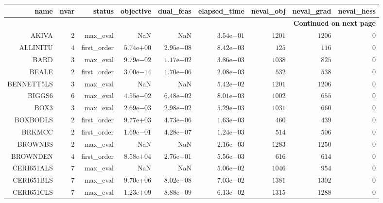 \begin{longtable}{rrrrrrrrr}
\hline
name & nvar & status & objective & dual\_feas & elapsed\_time & neval\_obj & neval\_grad & neval\_hess \\\hline
\endhead
\hline
\multicolumn{9}{r}{{\bfseries Continued on next page}}\\
\hline
\endfoot
\endlastfoot
AKIVA & \(     2\) & max\_eval &       NaN &       NaN & \( 3.54\)e\(-01\) & \(  1201\) & \(  1206\) & \(     0\) \\
ALLINITU & \(     4\) & first\_order & \( 5.74\)e\(+00\) & \( 2.95\)e\(-08\) & \( 8.42\)e\(-03\) & \(   125\) & \(   116\) & \(     0\) \\
BARD & \(     3\) & max\_eval & \( 9.79\)e\(-02\) & \( 1.17\)e\(-02\) & \( 3.86\)e\(-03\) & \(  1038\) & \(   825\) & \(     0\) \\
BEALE & \(     2\) & first\_order & \( 3.00\)e\(-14\) & \( 1.70\)e\(-06\) & \( 2.08\)e\(-03\) & \(   532\) & \(   538\) & \(     0\) \\
BENNETT5LS & \(     3\) & max\_eval &       NaN &       NaN & \( 5.42\)e\(-02\) & \(  1201\) & \(  1206\) & \(     0\) \\
BIGGS6 & \(     6\) & max\_eval & \( 4.55\)e\(-02\) & \( 6.48\)e\(-02\) & \( 8.01\)e\(-03\) & \(  1002\) & \(   655\) & \(     0\) \\
BOX3 & \(     3\) & max\_eval & \( 2.69\)e\(-03\) & \( 2.98\)e\(-02\) & \( 5.29\)e\(-03\) & \(  1031\) & \(   660\) & \(     0\) \\
BOXBODLS & \(     2\) & first\_order & \( 9.77\)e\(+03\) & \( 4.73\)e\(-06\) & \( 1.63\)e\(-03\) & \(   460\) & \(   439\) & \(     0\) \\
BRKMCC & \(     2\) & first\_order & \( 1.69\)e\(-01\) & \( 4.28\)e\(-07\) & \( 1.24\)e\(-03\) & \(   514\) & \(   506\) & \(     0\) \\
BROWNBS & \(     2\) & max\_eval &       NaN &       NaN & \( 2.16\)e\(-03\) & \(  1283\) & \(  1250\) & \(     0\) \\
BROWNDEN & \(     4\) & first\_order & \( 8.58\)e\(+04\) & \( 2.76\)e\(-01\) & \( 5.56\)e\(-03\) & \(   616\) & \(   614\) & \(     0\) \\
CERI651ALS & \(     7\) & max\_eval &       NaN &       NaN & \( 5.06\)e\(-02\) & \(  1046\) & \(   954\) & \(     0\) \\
CERI651BLS & \(     7\) & max\_eval & \( 9.70\)e\(+06\) & \( 8.02\)e\(+08\) & \( 7.03\)e\(-02\) & \(  1381\) & \(  1302\) & \(     0\) \\
CERI651CLS & \(     7\) & max\_eval & \( 1.23\)e\(+09\) & \( 8.88\)e\(+09\) & \( 6.13\)e\(-02\) & \(  1315\) & \(  1288\) & \(     0\) \\

\end{longtable}
